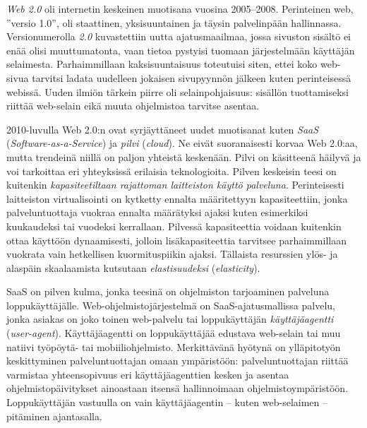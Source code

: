 \documentclass[finnish,gradu]{tktltiki}
\begin{document}
  \emph{Web 2.0} oli internetin keskeinen muotisana vuosina 2005--2008. Perinteinen web, ''versio 1.0'', oli staattinen, yksisuuntainen ja täysin palvelinpään hallinnassa. Versionumerolla \emph{2.0} kuvastettiin uutta ajatusmaailmaa, jossa sivuston sisältö ei enää olisi muuttumatonta, vaan tietoa pystyisi tuomaan järjestelmään käyttäjän selaimesta. Parhaimmillaan kaksisuuntaisuus toteutuisi siten, ettei koko web-sivua tarvitsi ladata uudelleen jokaisen sivupyynnön jälkeen kuten perinteisessä webissä. Uuden ilmiön tärkein piirre oli selainpohjaisuus: sisällön tuottamiseksi riittää web-selain eikä muuta ohjelmistoa tarvitse asentaa.

  2010-luvulla Web 2.0:n ovat syrjäyttäneet uudet muotisanat kuten \emph{SaaS} (\emph{Software-as-a-Service}) ja \emph{pilvi} (\emph{cloud}). Ne eivät suoranaisesti korvaa Web 2.0:aa, mutta trendeinä niillä on paljon yhteistä keskenään. Pilvi on käsitteenä häilyvä ja voi tarkoittaa eri yhteyksissä erilaisia teknologioita. Pilven keskeisin teesi on kuitenkin \emph{kapasiteetiltaan rajattoman laitteiston käyttö palveluna}. Perinteisesti laitteiston virtualisointi on kytketty ennalta määritettyyn kapasiteettiin, jonka palveluntuottaja vuokraa ennalta määrätyksi ajaksi kuten esimerkiksi kuukaudeksi tai vuodeksi kerrallaan. Pilvessä kapasiteettia voidaan kuitenkin ottaa käyttöön dynaamisesti, jolloin lisäkapasiteettia tarvitsee parhaimmillaan vuokrata vain hetkellisen kuormituspiikin ajaksi. Tällaista resurssien ylös- ja alaspäin skaalaamista kutsutaan \emph{elastisuudeksi} (\emph{elasticity}).


  SaaS on pilven kulma, jonka teesinä on ohjelmiston tarjoaminen palveluna loppukäyttäjälle. Web-ohjelmistojärjestelmä on SaaS-ajatusmallissa palvelu, jonka asiakas on joko toinen web-palvelu tai loppukäyttäjän \emph{käyttäjäagentti} (\emph{user-agent}). Käyttäjäagentti on loppukäyttäjää edustava web-selain tai muu natiivi työpöytä- tai mobiiliohjelmisto. Merkittävänä hyötynä on ylläpitotyön keskittyminen palveluntuottajan omaan ympäristöön: palveluntuottajan riittää varmistaa yhteensopivuus eri käyttäjäagenttien kesken ja asentaa ohjelmistopäivitykset ainoastaan itsensä hallinnoimaan ohjelmistoympäristöön. Loppukäyttäjän vastuulla on vain käyttäjäagentin -- kuten web-selaimen -- pitäminen ajantasalla.
\end{document}
